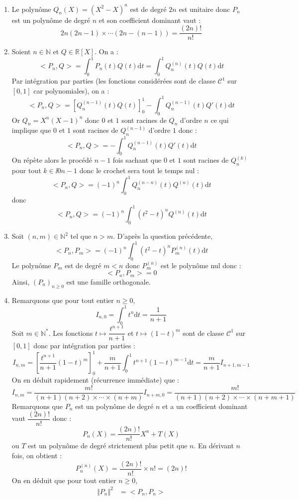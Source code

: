 \documentclass[a4paper,twoside,french,11pt]{VcCours}
\newcommand{\dt}{\text{d}t}
\begin{document}
\begin{enumerate}
\item Le polynôme $Q_n(X)=(X^2-X)^n$ est de degré $2n$ est unitaire donc $P_n$ est un polynôme de degré $n$ et son coefficient dominant vaut :
$$ 2n(2n-1) \times \cdots (2n-(n-1)) =\dfrac{(2n)!}{n!}$$
\item Soient $n \in \mathbb{N}$ et $Q \in \mathbb{R}[X]$. On a :
$$ <P_n,Q> = \int_0^1 P_n(t) Q(t) \dt = \int_0^1 Q_n^{(n)}(t) Q(t) \dt$$
Par intégration par parties (les fonctions considérées sont de classe $\mathcal{C}^1$ sur $[0,1]$ car polynomiales), on a :
$$ <P_n,Q> = [Q_n^{(n-1)}(t) Q(t)]_0^1 - \int_0^1 Q_n^{(n-1)}(t) Q'(t) \dt$$
Or $Q_n=X^n(X-1)^n$ donc $0$ et $1$ sont racines de $Q_n$ d'ordre $n$ ce qui implique que $0$ et $1$ sont racines de $Q_n^{(n-1)}$ d'ordre $1$ donc :
$$ <P_n,Q> =  - \int_0^1 Q_n^{(n-1)}(t) Q'(t) \dt$$
On répète alors le procédé $n-1$ fois sachant que $0$ et $1$ sont racines de $Q_n^{(k)}$ pour tout $k \in \ii{0}{n-1}$ donc le \og crochet \fg{} sera tout le temps nul :
$$ <P_n,Q> = (-1)^n \int_0^1 Q_n^{(n-n)}(t) Q^{(n)}(t) \dt$$
donc
$$ <P_n,Q> = (-1)^n \int_{0}^1 (t^2-t)^n Q^{(n)}(t) \dt $$
\item Soit $(n,m) \in \mathbb{N}^2$ tel que $n>m$. D'après la question précédente,
$$ <P_n,P_m> = (-1)^n \int_{0}^1 (t^2-t)^n P_m^{(n)}(t) \dt$$
Le polynôme $P_m$ est de degré $m<n$ donc $P_m^{(n)}$ est le polynôme nul donc :
$$ <P_n,P_m>  = 0$$
Ainsi, $(P_n)_{n \geq 0}$ est une famille orthogonale.
\item Remarquons que pour tout entier $n \geq 0$,
$$ I_{n,0} = \int_0^1 t^n \dt = \dfrac{1}{n+1}$$
Soit $m \in \mathbb{N}^*$. Les fonctions $t \mapsto \dfrac{t^{n+1}}{n+1}$ et $t \mapsto (1-t)^m$ sont de classe $\mathcal{C}^1$ sur $[0,1]$ donc par intégration par parties :
$$ I_{n,m} = \left[ \dfrac{t^{n+1}}{n+1}(1-t)^{m} \right]_0^1 + \dfrac{m}{n+1} \int_0^1 t^{n+1}(1-t)^{m-1} \dt =  \dfrac{m}{n+1} I_{n+1,m-1}$$
On en déduit rapidement (récurrence immédiate) que : 
$$ I_{n,m} = \dfrac{m!}{(n+1)(n+2) \times \cdots \times (n+m)} I_{n+m,0} =   \dfrac{m!}{(n+1)(n+2) \times \cdots \times (n+m+1)}$$
Remarquons que $P_n$ est un polynôme de degré $n$ et a un coefficient dominant vaut $\dfrac{(2n)!}{n!}$ donc :
$$ P_n(X) = \dfrac{(2n)!}{n!} X^n + T(X)$$
ou $T$ est un polynôme de degré strictement plus petit que $n$. En dérivant $n$ fois, on obtient :
$$ P_n^{(n)}(X) = \dfrac{(2n)!}{n!} \times n! = (2n)!$$
On en déduit que pour tout entier $n \geq 0$,
\begin{align*}
\Vert P_n \Vert^2 & = <P_n,P_n> \\

\end{align*}
\end{enumerate}
\end{document}
